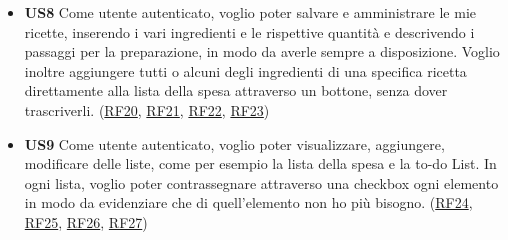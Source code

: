 \documentclass[a4paper,12pt]{article}
\begin{document}
\begin{itemize}
\begin{center}
\end{center}

\item \textbf {US8}  Come utente autenticato, voglio poter salvare e amministrare le mie ricette, inserendo i vari ingredienti e le rispettive quantità e descrivendo i passaggi per la preparazione, in modo da averle sempre a disposizione. Voglio inoltre aggiungere tutti o alcuni degli ingredienti di una specifica ricetta direttamente alla lista della spesa attraverso un bottone, senza dover trascriverli. (\hyperlink{RF20}{RF20}, \hyperlink{RF21}{RF21}, \hyperlink{RF22}{RF22}, \hyperlink{RF23}{RF23})

\begin{center}
\end{center}

\item \textbf {US9}  Come utente autenticato, voglio poter visualizzare, aggiungere, modificare delle liste, come per esempio la lista della spesa e la to-do List. In ogni lista, voglio poter contrassegnare attraverso una checkbox ogni elemento in modo da evidenziare che di quell'elemento non ho più bisogno. (\hyperlink{RF24}{RF24}, \hyperlink{RF25}{RF25}, \hyperlink{RF26}{RF26}, \hyperlink{RF27}{RF27})

\begin{center}
\end{center}

\end{itemize}
\end{document}
